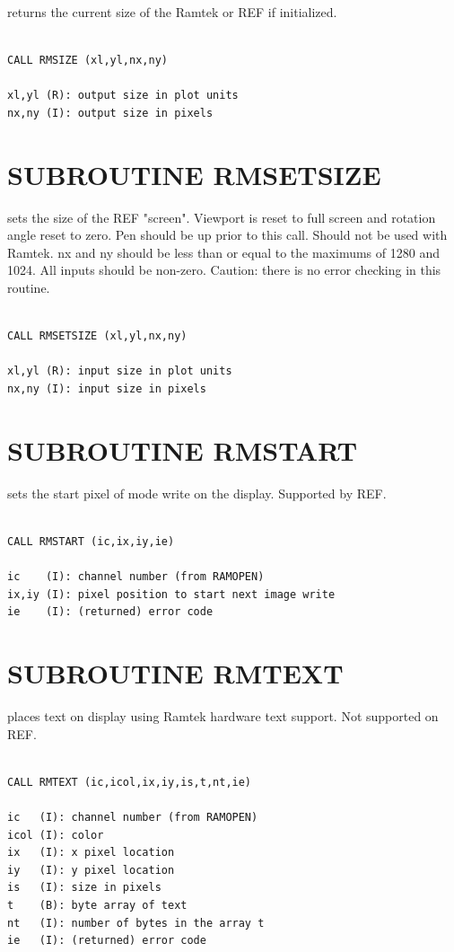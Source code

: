 \documentclass[11pt]{report}
\begin{document}
 returns the current size of the Ramtek or REF if initialized.
\begin{verbatim}

CALL RMSIZE (xl,yl,nx,ny)

xl,yl (R): output size in plot units
nx,ny (I): output size in pixels
\end{verbatim}

\section{SUBROUTINE  RMSETSIZE}

 sets the size of the REF "screen".  Viewport is reset
to full screen and rotation angle reset to zero.  Pen should be
up prior to this call. Should not be used with Ramtek.  nx and ny
should be less than or equal to the maximums of 1280 and 1024.
All inputs should be non-zero. Caution: there is no error checking
in this routine.
\begin{verbatim}

CALL RMSETSIZE (xl,yl,nx,ny)

xl,yl (R): input size in plot units
nx,ny (I): input size in pixels
\end{verbatim}

\section{SUBROUTINE RMSTART}

 sets the start pixel of  mode write on the  display.
Supported by REF.
\begin{verbatim}

CALL RMSTART (ic,ix,iy,ie)

ic    (I): channel number (from RAMOPEN)
ix,iy (I): pixel position to start next image write
ie    (I): (returned) error code
\end{verbatim}

\section{SUBROUTINE RMTEXT}

 places text on  display using Ramtek hardware text support.
Not supported on REF.
\begin{verbatim}

CALL RMTEXT (ic,icol,ix,iy,is,t,nt,ie)

ic   (I): channel number (from RAMOPEN)
icol (I): color
ix   (I): x pixel location
iy   (I): y pixel location
is   (I): size in pixels
t    (B): byte array of text
nt   (I): number of bytes in the array t
ie   (I): (returned) error code
\end{verbatim}
\end{document}
